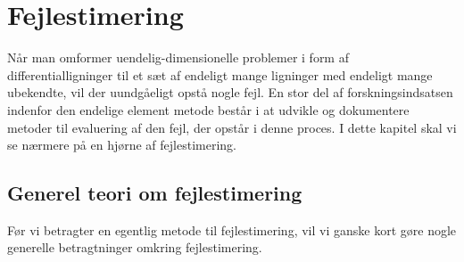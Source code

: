 \chapter{Fejlestimering} \label{fejlestimering} 

Når man omformer uendelig-dimensionelle problemer i form af
differentialligninger til et sæt af endeligt mange ligninger med
endeligt mange ubekendte, vil der uundgåeligt opstå nogle fejl. En stor
del af forskningsindsatsen indenfor den endelige element metode består
i at udvikle og dokumentere metoder til evaluering af den fejl, der
opstår i denne proces. I dette kapitel skal vi se nærmere på en hjørne
af fejlestimering.

\section{Generel teori om fejlestimering}
Før vi betragter en egentlig metode til fejlestimering, vil vi ganske
kort gøre nogle generelle betragtninger omkring fejlestimering.

